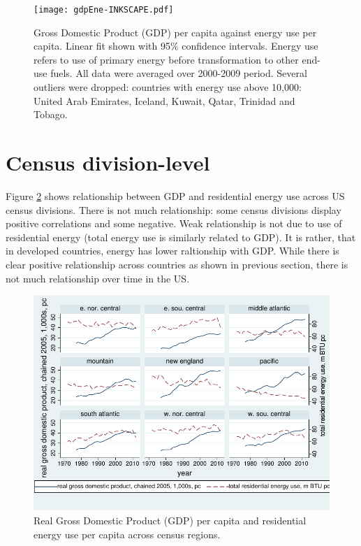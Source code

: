 \documentclass[10pt, letterpaper]{article}
\begin{document}
\begin{spacing}{1.5}
\begin{figure}[H]
 \texttt{[image: gdpEne-INKSCAPE.pdf]}\centering \caption{Gross Domestic
   Product (GDP) per capita against energy use per capita.
Linear fit shown with 95\%  confidence intervals. Energy use
   refers to use of primary energy before transformation to other end-use
   fuels. All data were averaged over 2000-2009 period.  %
 Several outliers were dropped: countries with energy use above 10,000: United Arab Emirates, Iceland, Kuwait, Qatar, Trinidad and Tobago.}\label{gdpEne} 
\end{figure}

\section{Census division-level}

Figure \ref{GDP-TERPB} shows relationship between GDP and residential
energy use across US census divisions. There is not much relationship: some census divisions
display positive correlations and some negative. Weak relationship is not due to
use of residential energy (total energy use is similarly related to GDP). It is
rather, that in developed countries, energy has lower raltionship with GDP.
While there is clear positive relationship across countries as shown in previous
section, there is not much relationship over time in the US.

\begin{figure}[H]
 \includegraphics[width=7in]{GDP-TERPB-INKSCAPE.pdf}\centering \caption{Real Gross Domestic
   Product (GDP) per capita and residential energy use per capita across  census regions.}\label{GDP-TERPB} 
\end{figure}


\end{spacing}
\end{document}
